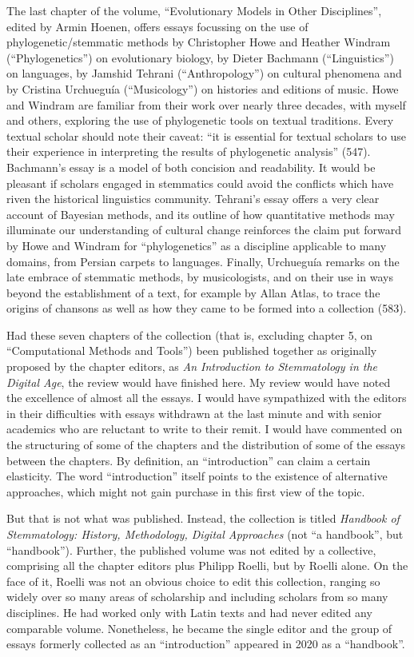 \documentclass{article}
\begin{document}
\newpage

\noindent The last chapter of the volume, ``Evolutionary Models in Other
Disciplines'', edited by Armin Hoenen, offers essays focussing on the
use of phylogenetic/stemmatic methods by Christopher Howe and Heather
Windram (``Phylogenetics'') on evolutionary biology, by Dieter Bachmann
(``Linguistics'') on languages, by Jamshid Tehrani (``Anthropology'') on
cultural phenomena and by Cristina Urchueguía (``Musicology'') on
histories and editions of music. Howe and Windram are familiar from
their work over nearly three decades, with myself and others, exploring
the use of phylogenetic tools on textual traditions. Every textual
scholar should note their caveat: ``it is essential for textual scholars
to use their experience in interpreting the results of phylogenetic
analysis'' (547). Bachmann's essay is a model of both concision and
readability. It would be pleasant if scholars engaged in stemmatics
could avoid the conflicts which have riven the historical linguistics
community. Tehrani's essay offers a very clear account of Bayesian
methods, and its outline of how quantitative methods may illuminate our
understanding of cultural change reinforces the claim put forward by
Howe and Windram for ``phylogenetics'' as a discipline applicable to
many domains, from Persian carpets to languages. Finally, Urchueguía
remarks on the late embrace of stemmatic methods, by musicologists, and
on their use in ways beyond the establishment of a text, for example by
Allan Atlas, to trace the origins of chansons as well as how they came
to be formed into a collection (583).

Had these seven chapters of the collection (that is, excluding
chapter 5, on ``Computational Methods and Tools'') been published
together as originally proposed by the chapter editors, as \emph{An
Introduction to Stemmatology in the Digital Age}, the review would have
finished here. My review would have noted the excellence of almost all
the essays. I would have sympathized with the editors in their
difficulties with essays withdrawn at the last minute and with senior
academics who are reluctant to write to their remit. I would have
commented on the structuring of some of the chapters and the
distribution of some of the essays between the chapters. By definition,
an ``introduction'' can claim a certain elasticity. The word
``introduction'' itself points to the existence of alternative
approaches, which might not gain purchase in this first view of the
topic.

But that is not what was published. Instead, the collection is
titled \emph{Handbook of Stemmatology: History, Methodology, Digital
Approaches} (not ``a handbook'', but ``handbook''). Further, the
published volume was not edited by a collective, comprising all the
chapter editors plus Philipp Roelli, but by Roelli alone. On the face
of it, Roelli was not an obvious choice to edit this collection, ranging
so widely over so many areas of scholarship and including scholars from
so many disciplines. He had worked only with Latin texts and had never
edited any comparable volume. Nonetheless, he became the single editor
and the group of essays formerly collected as an ``introduction''
appeared in 2020 as a ``handbook''.
\end{document}
